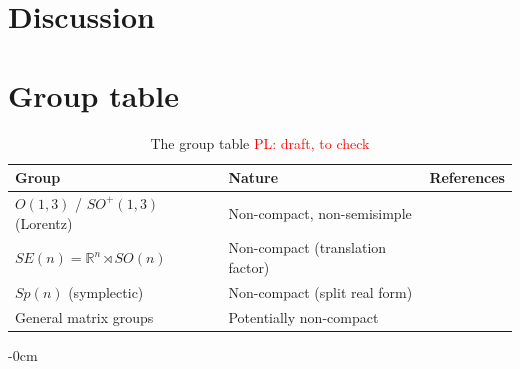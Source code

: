 \documentclass[mathematics,review,submit,moreauthors]{Definitions/mdpi}
\newcommand{\pnote}[1]{\textcolor{red}{PL: #1}}
\begin{document}
\section{Discussion}


\authorcontributions{}

\funding{}

\acknowledgments{}






\appendixstart
\appendix
\section[\appendixname~\thesection]{Group table}

\begin{table}[ht]
    \centering
    \begin{tabularx}{\textwidth}{|l|l|X|}
        \hline
        \textbf{Group} & \textbf{Nature} & \textbf{References} \\
        \hline
        $O(1,3)$ / $SO^+(1,3)$ (Lorentz) & Non-compact, non-semisimple
            & \cite{bogatskiy2020p3icml,spinner2024,ruhe2023,ali2024,yang2023p4icml} \\
        \hline
        $SE(n) = \mathbb{R}^n \rtimes SO(n)$ & Non-compact (translation factor)
            & \cite{yarotsky2018r,finzi2020p3icml,finzi2021p3icml} \\
        \hline
        $Sp(n)$ (symplectic) & Non-compact (split real form)
            & \cite{finzi2021p3icml,pearce-crump2023p4icml} \\
        \hline
        General matrix groups & Potentially non-compact
            & \cite{finzi2021p3icml,desai2022prd} \\
        \hline
    \end{tabularx}
    \caption{The group table \pnote{draft, to check}}
    \label{tab:groups}
\end{table}


% 

\begin{adjustwidth}{-\extralength}{0cm}



\PublishersNote{}
\end{adjustwidth}
\end{document}
